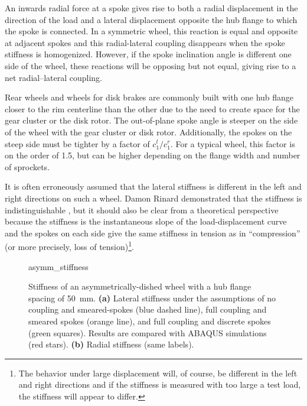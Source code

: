 \documentclass[\rootdir/thesis.tex]{subfiles}
\begin{document}
An inwards radial force at a spoke gives rise to both a radial displacement in the direction of the load and a lateral displacement opposite the hub flange to which the spoke is connected. In a symmetric wheel, this reaction is equal and opposite at adjacent spokes and this radial-lateral coupling disappears when the spoke stiffness is homogenized. However, if the spoke inclination angle is different one side of the wheel, these reactions will be opposing but not equal, giving rise to a net radial--lateral coupling.

Rear wheels and wheels for disk brakes are commonly built with one hub flange closer to the rim centerline than the other due to the need to create space for the gear cluster or the disk rotor. The out-of-plane spoke angle is steeper on the side of the wheel with the gear cluster or disk rotor. Additionally, the spokes on the steep side must be tighter by a factor of $c_1^l/c_1^r$. For a typical wheel, this factor is on the order of 1.5, but can be higher depending on the flange width and number of sprockets.

It is often erroneously assumed that the lateral stiffness is different in the left and right directions on such a wheel. Damon Rinard demonstrated that the stiffness is indistinguishable \cite{Rinard}, but it should also be clear from a theoretical perspective because the stiffness is the instantaneous slope of the load-displacement curve and the spokes on each side give the same stiffness in tension as in ``compression'' (or more precisely, loss of tension)\footnote{The behavior under large displacement will, of course, be different in the left and right directions and if the stiffness is measured with too large a test load, the stiffness will appear to differ.}.

\begin{figure}[t]
\centering
{asymm_stiffness}
\caption[Stiffness of wheels with left-right asymmetry]{Stiffness of an asymmetrically-dished wheel with a hub flange spacing of \SI{50}{mm}. \textbf{(a)} Lateral stiffness under the assumptions of no coupling and smeared-spokes (blue dashed line), full coupling and smeared spokes (orange line), and full coupling and discrete spokes (green squares). Results are compared with ABAQUS simulations (red stars). \textbf{(b)} Radial stiffness (same labels).}
\label{fig:asymm_wheel}
\end{figure}
\end{document}
